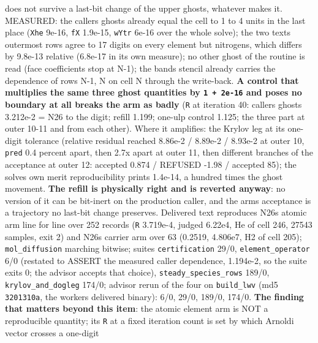 \documentclass[english,a4paper]{my_memo}
\begin{document}
\begin{itemize}
{  does not survive a last-bit change of the upper ghosts, whatever makes
  it.} MEASURED: the caller\textquotesingle s ghosts already equal the cell to 1 to 4 units
  in the last place (\texttt{Xhe} 9e-16, \texttt{fX} 1.9e-15, \texttt{wYtr} 6e-16 over the whole
  solve); the two texts\textquotesingle{} outermost rows agree to 17 digits on every element
  but nitrogen\textquotesingle s, which differs by 9.8e-13 relative (6.8e-17 in its own
  measure); no other ghost of the routine is read (face coefficients stop at
  N-1); the band\textquotesingle s stencil already carries the dependence of rows N-1, N on
  cell N through the write-back. \textbf{A control that multiplies the same three
  ghost quantities by \texttt{1\ +\ 2e-16} and poses no boundary at all breaks the arm
  as badly} (\texttt{\textbar{}\textbar{}R\textbar{}\textbar{}} at iteration 40: caller\textquotesingle s ghosts 3.212e-2 = N26 to the
  digit; refill 1.199; one-ulp control 1.125; the three part at outer 10-11
  and from each other). Where it amplifies: the Krylov leg at its one-digit
  tolerance (relative residual reached 8.86e-2 / 8.89e-2 / 8.93e-2 at outer
  10, \texttt{pred} 0.4 percent apart, then 2.7x apart at outer 11, then different
  branches of the acceptance at outer 12: accepted 0.874 / REFUSED -1.98 /
  accepted 85); the solve\textquotesingle s own merit reproducibility prints 1.4e-14, a
  hundred times the ghost movement. \textbf{The refill is physically right and is
  reverted anyway}: no version of it can be bit-inert on the production
  caller, and the arm\textquotesingle s acceptance is a trajectory no last-bit change
  preserves. Delivered text reproduces N26\textquotesingle s atomic arm line for line over
  252 records (\texttt{\textbar{}\textbar{}R\textbar{}\textbar{}} 3.719e-4, judged 6.22e4, He of cell 246, 27543
  samples, exit 2) and N26\textquotesingle s carrier arm over 63 (0.2519, 4.806e7, H2 of
  cell 205); \texttt{mol\_diffusion} marching bitwise; suites \texttt{certification} 29/0,
  \texttt{element\_operator} 6/0 (restated to ASSERT the measured caller dependence,
  1.194e-2, so the suite exits 0; the advisor accepts that choice),
  \texttt{steady\_species\_rows} 189/0, \texttt{krylov\_and\_dogleg} 174/0; advisor rerun of
  the four on \texttt{build\_lwv} (md5 \texttt{3201310a}, the worker\textquotesingle s delivered binary):
  6/0, 29/0, 189/0, 174/0. \textbf{The finding that matters beyond this item}:
  the atomic element arm is NOT a reproducible quantity; its \texttt{\textbar{}\textbar{}R\textbar{}\textbar{}} at a
  fixed iteration count is set by which Arnoldi vector crosses a one-digit

\end{itemize}
\end{document}
